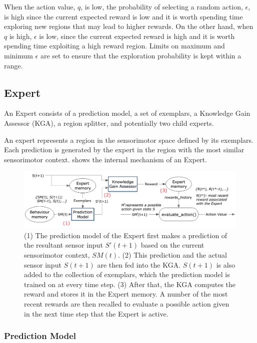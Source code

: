 When the action value, $q$,  is low, the probability of selecting a random action, $\epsilon$, is high since the current expected reward is low and it is worth spending time exploring new regions that may lead to higher rewards. On the other hand, when $q$ is high, $\epsilon$ is low, since the current expected reward is high and it is worth spending time exploiting a high reward region. Limits on maximum and minimum $\epsilon$ are set to ensure that the exploration probability is kept within a range.

\subsection{Expert}

An Expert consists of a prediction model, a set of exemplars, a Knowledge Gain Assessor (KGA), a region splitter, and potentially two child experts. 

An expert represents a region in the sensorimotor space defined by its exemplars. Each prediction is generated by the expert in the region with the most similar sensorimotor context.  shows the internal mechanism of an Expert.

\begin{figure}[!htb]
	\centering
	\includegraphics[width=1.0 \textwidth]{"fig/cbla/Block Diagram Expert"}
	\caption[Block diagram of the Expert]{(1) The prediction model of the Expert first makes a prediction of the resultant sensor input $S'(t+1)$ based on the current sensorimotor context, $SM(t)$. (2) This prediction and the actual sensor input $S(t+1)$ are then fed into the KGA. $S(t+1)$ is also added to the collection of exemplars, which the prediction model is trained on at every time step. (3) After that, the KGA computes the reward and stores it in the Expert memory. A number of the most recent rewards are then recalled to evaluate a possible action given in the next time step that the Expert is active.}
	\label{fig:Block Diagram Expert}
\end{figure}


\subsubsection{Prediction Model}

